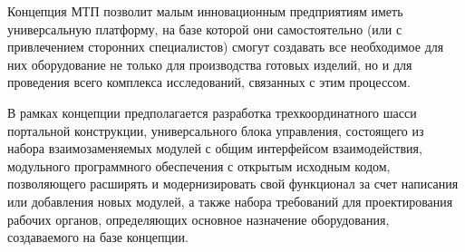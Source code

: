 Концепция МТП позволит малым инновационным предприятиям иметь универсальную платформу, на базе которой они самостоятельно (или с привлечением сторонних специалистов) смогут создавать все необходимое для них оборудование не только для производства готовых изделий, но и для проведения всего комплекса исследований, связанных с этим процессом.

В рамках концепции предполагается разработка трехкоординатного шасси портальной конструкции, универсального блока управления, состоящего из набора взаимозаменяемых модулей с общим интерфейсом взаимодействия, модульного программного обеспечения с открытым исходным кодом, позволяющего расширять и модернизировать свой функционал за счет написания или добавления новых модулей, а также набора требований для проектирования рабочих органов, определяющих основное назначение оборудования, создаваемого на базе концепции.


\FloatBarrier

\nocite{*}

\FloatBarrier